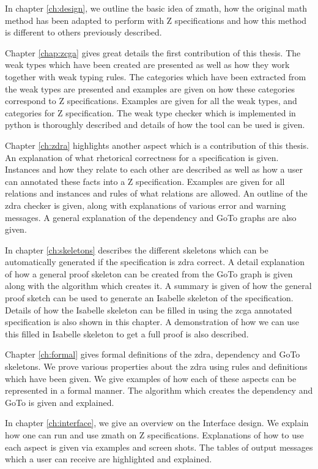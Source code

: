 In chapter \ref{ch:design}, we outline the basic idea of \gls{zmath}, how the original \gls{math} method has been adapted to perform with Z specifications and how this method is different to others previously described.

Chapter \ref{chap:zcga} gives great details the first contribution of this thesis. The weak types which have been created are presented as well as how they work together with weak typing rules. The categories which have been extracted from the weak types are presented and examples are given on how these categories correspond to Z specifications. Examples are given for all the weak types, and categories for Z specification. The weak type checker which is implemented in python is thoroughly described and details of how the tool can be used is given.

Chapter \ref{ch:zdra} highlights another aspect which is a contribution of this thesis. An explanation of what rhetorical correctness for a specification is given. Instances and how they relate to each other are described as well as how a user can annotated these facts into a Z specification. Examples are given for all relations and instances and rules of what relations are allowed. An outline of the \gls{zdra} checker is given, along with explanations of various error and warning messages. A general explanation of the dependency and GoTo graphs are also given.

In chapter \ref{ch:skeletons} describes the different skeletons which can be automatically generated if the specification is \gls{zdra} correct. A detail explanation of how a general proof skeleton can be created from the GoTo graph is given along with the algorithm which creates it. A summary is given of how the general proof sketch can be used to generate an Isabelle skeleton of the specification. Details of how the Isabelle skeleton can be filled in using the \gls{zcga} annotated specification is also shown in this chapter. A demonstration of how we can use this filled in Isabelle skeleton to get a full proof is also described.

Chapter \ref{ch:formal} gives formal definitions of the \gls{zdra}, dependency and GoTo skeletons. We prove various properties about the \gls{zdra} using rules and definitions which have been given. We give examples of how each of these aspects can be represented in a formal manner. The algorithm which creates the dependency and GoTo is given and explained.

In chapter \ref{ch:interface}, we give an overview on the Interface design. We explain how one can run and use \gls{zmath} on Z specifications. Explanations of how to use each aspect is given via examples and screen shots. The tables of output messages which a user can receive are highlighted and explained.

